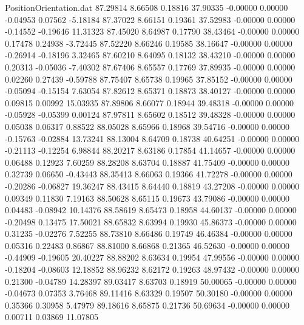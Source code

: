 \begin{filecontents}{PositionOrientation.dat}
  87.29814    8.66508    0.18816    37.90335   -0.00000    0.00000   -0.04953    0.07562   -5.18184
  87.37022    8.66151    0.19361    37.52983   -0.00000    0.00000   -0.14552   -0.19646   11.31323
  87.45020    8.64987    0.17790    38.43464   -0.00000    0.00000    0.17478    0.24938   -3.72445
  87.52220    8.66246    0.19585    38.16647   -0.00000    0.00000   -0.26914   -0.18196    3.32465
  87.60210    8.64095    0.18132    38.43210   -0.00000    0.00000    0.20313   -0.05036   -7.40302
  87.67406    8.65557    0.17769    37.89935   -0.00000    0.00000    0.02260    0.27439   -0.59788
  87.75407    8.65738    0.19965    37.85152   -0.00000    0.00000   -0.05094   -0.15154    7.63054
  87.82612    8.65371    0.18873    38.40127   -0.00000    0.00000    0.09815    0.00992   15.03935
  87.89806    8.66077    0.18944    39.48318   -0.00000    0.00000   -0.05928   -0.05399    0.00124
  87.97811    8.65602    0.18512    39.48328   -0.00000    0.00000    0.05038    0.06317    0.88522
  88.05028    8.65966    0.18968    39.54716   -0.00000    0.00000   -0.15763   -0.02884   13.73241
  88.13004    8.64709    0.18738    40.64251   -0.00000    0.00000   -0.21113   -0.12254    6.98844
  88.20217    8.63186    0.17854    41.14657   -0.00000    0.00000    0.06488    0.12923    7.60259
  88.28208    8.63704    0.18887    41.75409   -0.00000    0.00000    0.32739    0.06650   -0.43443
  88.35413    8.66063    0.19366    41.72278   -0.00000    0.00000   -0.20286   -0.06827   19.36247
  88.43415    8.64440    0.18819    43.27208   -0.00000    0.00000    0.09349    0.11830    7.19163
  88.50628    8.65115    0.19673    43.79086   -0.00000    0.00000    0.04483   -0.08942   10.14376
  88.58619    8.65473    0.18958    44.60137   -0.00000    0.00000   -0.20498    0.13475   17.50021
  88.65832    8.63994    0.19930    45.86373   -0.00000    0.00000    0.31235   -0.02276    7.52255
  88.73810    8.66486    0.19749    46.46384   -0.00000    0.00000    0.05316    0.22483    0.86867
  88.81000    8.66868    0.21365    46.52630   -0.00000    0.00000   -0.44909   -0.19605   20.40227
  88.88202    8.63634    0.19954    47.99556   -0.00000    0.00000   -0.18204   -0.08603   12.18852
  88.96232    8.62172    0.19263    48.97432   -0.00000    0.00000    0.21300   -0.04789   14.28397
  89.03417    8.63703    0.18919    50.00065   -0.00000    0.00000   -0.04673    0.07353    3.76468
  89.11416    8.63329    0.19507    50.30180   -0.00000    0.00000    0.35366    0.30958    5.47979
  89.18616    8.65875    0.21736    50.69634   -0.00000    0.00000    0.00711    0.03869   11.07805

\end{filecontents}
